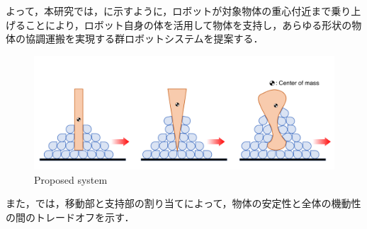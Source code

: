 よって，本研究では，に示すように，ロボットが対象物体の重心付近まで乗り上げることにより，ロボット自身の体を活用して物体を支持し，あらゆる形状の物体の協調運搬を実現する群ロボットシステムを提案する．
\begin{figure}[tb]
  \centering
  \includegraphics[width=0.96\columnwidth]{figure/proposed-system.pdf}
  \caption{Proposed system}
  \label{fig:proposed-system}
\end{figure}
また，では，移動部と支持部の割り当てによって，物体の安定性と全体の機動性の間のトレードオフを示す．
